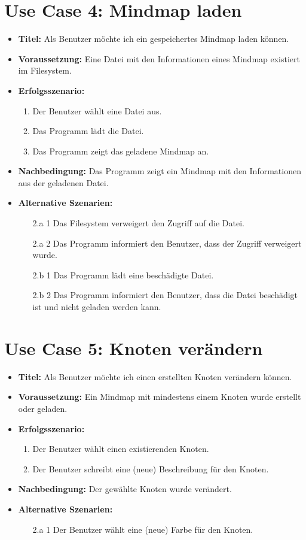 \section*{Use Case 4: Mindmap laden}
\begin{itemize}
\item \textbf{Titel:} Als Benutzer möchte ich ein gespeichertes Mindmap laden können.
\item \textbf{Voraussetzung:} Eine Datei mit den Informationen eines Mindmap existiert im Filesystem.
\item \textbf{Erfolgsszenario:}
	\begin{enumerate}
	\item Der Benutzer wählt eine Datei aus.
	\item Das Programm lädt die Datei.
	\item Das Programm zeigt das geladene Mindmap an.
	\end{enumerate}
\item \textbf{Nachbedingung:} Das Programm zeigt ein Mindmap mit den Informationen aus der geladenen Datei.
\item \textbf{Alternative Szenarien:}
	\begin{enumerate}
	\item [2.a 1] Das Filesystem verweigert den Zugriff auf die Datei.
	\item [2.a 2] Das Programm informiert den Benutzer, dass der Zugriff verweigert wurde.
	\item []
	\item [2.b 1] Das Programm lädt eine beschädigte Datei.
	\item [2.b 2] Das Programm informiert den Benutzer, dass die Datei beschädigt ist und nicht geladen werden kann.
	\end{enumerate}
\end{itemize}

\section*{Use Case 5: Knoten verändern}
\begin{itemize}
\item \textbf{Titel:} Als Benutzer möchte ich einen erstellten Knoten verändern können.
\item \textbf{Voraussetzung:} Ein Mindmap mit mindestens einem Knoten wurde erstellt oder geladen.
\item \textbf{Erfolgsszenario:}
	\begin{enumerate}
	\item Der Benutzer wählt einen existierenden Knoten.
	\item Der Benutzer schreibt eine (neue) Beschreibung für den Knoten.
	\end{enumerate}
\item \textbf{Nachbedingung:} Der gewählte Knoten wurde verändert.
\item \textbf{Alternative Szenarien:}
	\begin{enumerate}
	\item [2.a 1] Der Benutzer wählt eine (neue) Farbe für den Knoten.
	\end{enumerate}
\end{itemize}

